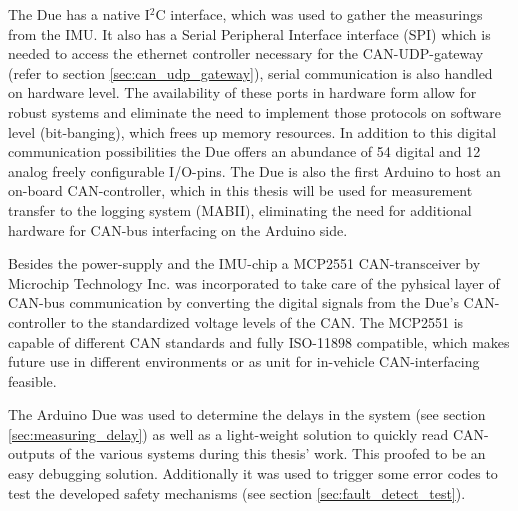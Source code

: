 \documentclass[ExampleMasters.tex]{subfiles}
\begin{document}
The Due has a native I$^{2}$C interface, which was used to gather the measurings from the IMU. It also has a Serial Peripheral Interface interface (SPI) which is needed to access the ethernet controller necessary for the CAN-UDP-gateway (refer to section \ref{sec:can_udp_gateway}), serial communication is also handled on hardware level. The availability of these ports in hardware form allow for robust systems and eliminate the need to implement those protocols on software level (bit-banging), which frees up memory resources. In addition to this digital communication possibilities the Due offers an abundance of 54 digital and 12 analog freely configurable I/O-pins. The Due is also the first Arduino to host an on-board CAN-controller, which in this thesis will be used for measurement transfer to the logging system (MABII), eliminating the need for additional hardware for CAN-bus interfacing on the Arduino side.

Besides the power-supply and the IMU-chip a MCP2551 CAN-transceiver by Microchip Technology Inc. was incorporated to take care of the pyhsical layer of CAN-bus communication by converting the digital signals from the Due's CAN-controller to the standardized voltage levels of the CAN. The MCP2551 is capable of different CAN standards and fully ISO-11898 compatible, which makes future use in different environments or as unit for in-vehicle CAN-interfacing feasible.

The Arduino Due was used to determine the delays in the system (see section \ref{sec:measuring_delay}) as well as a light-weight solution to quickly read CAN-outputs of the various systems during this thesis' work. This proofed to be an easy debugging solution. Additionally it was used to trigger some error codes to test the developed safety mechanisms (see section \ref{sec:fault_detect_test}). 

\end{document}
